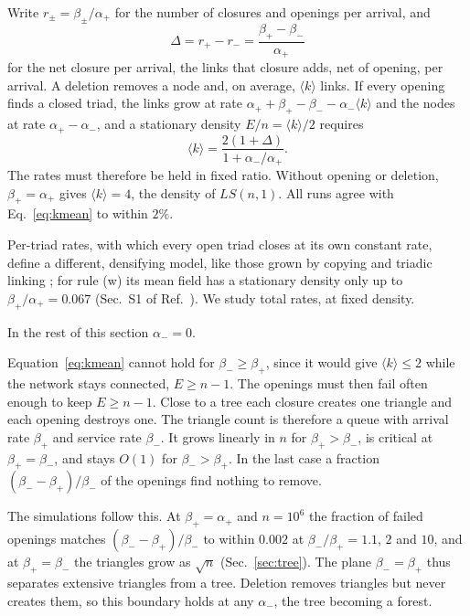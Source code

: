 \documentclass[aps,pre,twocolumn,superscriptaddress,floatfix,nofootinbib]{revtex4-2}
\begin{document}
Write $r_\pm=\beta_\pm/\alpha_+$ for the number of closures and openings per
arrival, and
\begin{equation}
  \Delta=r_+-r_-=\frac{\beta_+-\beta_-}{\alpha_+}
  \label{eq:Delta}
\end{equation}
for the net closure per arrival, the links that closure adds, net of opening,
per arrival.
A deletion removes a node and, on average, $\langle k\rangle$ links. If every
opening finds a closed triad, the links grow at rate
$\alpha_++\beta_+-\beta_--\alpha_-\langle k\rangle$ and the nodes at rate
$\alpha_+-\alpha_-$, and a stationary density $E/n=\langle k\rangle/2$
requires
\begin{equation}
  \langle k\rangle=\frac{2(1+\Delta)}{1+\alpha_-/\alpha_+}.
  \label{eq:kmean}
\end{equation}
The rates must therefore be held in fixed ratio. Without opening or deletion,
$\beta_+=\alpha_+$ gives $\langle k\rangle=4$, the density of $LS(n,1)$. All
runs agree with Eq.~\eqref{eq:kmean} to within $2\%$.

Per-triad rates, with which every open triad closes at its own constant rate,
define a different, densifying model, like those grown by copying and triadic
linking \cite{bhat2016,lambiotte2016}; for rule (w) its mean field has a
stationary density only up to $\beta_+/\alpha_+=0.067$ (Sec.~S1 of
Ref.~\cite{supp}). We study total rates, at fixed density.

In the rest of this section $\alpha_-=0$.

Equation~\eqref{eq:kmean} cannot hold for $\beta_-\ge\beta_+$, since it would
give $\langle k\rangle\le2$ while the network stays connected, $E\ge n-1$. The
openings must then fail often enough to keep $E\ge n-1$. Close to a tree each
closure creates one triangle and each opening destroys one. The triangle count
is therefore a queue with arrival rate $\beta_+$ and service rate $\beta_-$.
It grows linearly in $n$ for $\beta_+>\beta_-$, is critical at
$\beta_+=\beta_-$, and stays $O(1)$ for $\beta_->\beta_+$. In the last case a
fraction $(\beta_--\beta_+)/\beta_-$ of the openings find nothing to remove.

The simulations follow this. At $\beta_+=\alpha_+$ and $n=10^6$ the fraction
of failed openings matches $(\beta_--\beta_+)/\beta_-$ to within $0.002$ at
$\beta_-/\beta_+=1.1$, $2$ and $10$, and at
$\beta_+=\beta_-$ the triangles grow as $\sqrt n$ (Sec.~\ref{sec:tree}). The
plane $\beta_-=\beta_+$ thus separates extensive triangles from a tree. Deletion
removes triangles but never creates them, so this boundary holds at any
$\alpha_-$, the tree becoming a forest.
\end{document}
